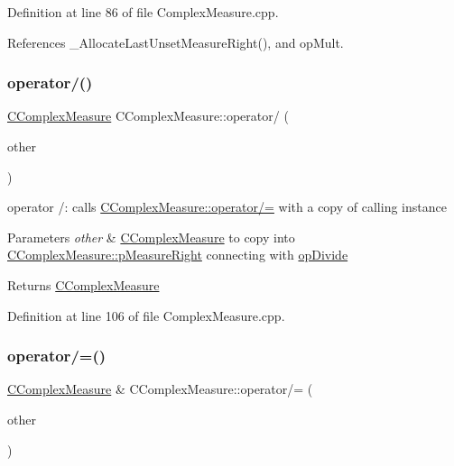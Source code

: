 Definition at line 86 of file Complex\+Measure.\+cpp.



References \+\_\+\+Allocate\+Last\+Unset\+Measure\+Right(), and op\+Mult.

\mbox{\label{classCComplexMeasure_a730c8745ab3d499a20d09f6faa47bdd2}} 
\subsubsection{\texorpdfstring{operator/()}{operator/()}}
{\footnotesize\ttfamily \hyperlink{classCComplexMeasure}{C\+Complex\+Measure} C\+Complex\+Measure\+::operator/ (\begin{DoxyParamCaption}\item[{const \hyperlink{classCComplexMeasure}{C\+Complex\+Measure} \&}]{other }\end{DoxyParamCaption})}



operator /\+: calls \hyperlink{classCComplexMeasure_a68c42a3ea08d1482f4dfdda5e34407f5}{C\+Complex\+Measure\+::operator/=} with a copy of calling instance 


\begin{DoxyParams}{Parameters}
{\em other} & \hyperlink{classCComplexMeasure}{C\+Complex\+Measure} to copy into \hyperlink{classCComplexMeasure_abbafc4b16676d223ed34860b8ece1b6b}{C\+Complex\+Measure\+::p\+Measure\+Right} connecting with \hyperlink{MeasureOperator_8h_a1431c79e3ad4b4c5bcc9f31f188538f2a160251a34f9a9a8ee362dc477d5ba790}{op\+Divide} \\
\hline
\end{DoxyParams}
\begin{DoxyReturn}{Returns}
\hyperlink{classCComplexMeasure}{C\+Complex\+Measure} 
\end{DoxyReturn}


Definition at line 106 of file Complex\+Measure.\+cpp.

\mbox{\label{classCComplexMeasure_a68c42a3ea08d1482f4dfdda5e34407f5}} 
\subsubsection{\texorpdfstring{operator/=()}{operator/=()}}
{\footnotesize\ttfamily \hyperlink{classCComplexMeasure}{C\+Complex\+Measure} \& C\+Complex\+Measure\+::operator/= (\begin{DoxyParamCaption}\item[{const \hyperlink{classCComplexMeasure}{C\+Complex\+Measure} \&}]{other }\end{DoxyParamCaption})}



